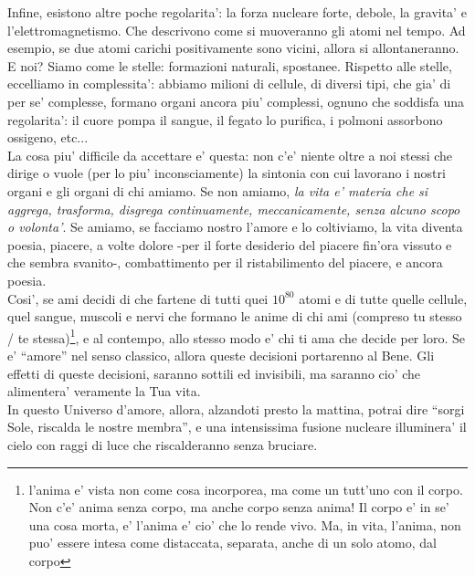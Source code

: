Infine, esistono altre poche regolarita': la forza nucleare forte, debole, la gravita' e l'elettromagnetismo. Che descrivono come si muoveranno gli atomi nel tempo. Ad esempio, se due atomi carichi positivamente sono vicini, allora si allontaneranno.\\

E noi? Siamo come le stelle: formazioni naturali, spostanee. Rispetto alle stelle, eccelliamo in complessita': abbiamo milioni di cellule, di diversi tipi, che gia' di per se' complesse, formano organi ancora piu' complessi, ognuno che soddisfa una regolarita': il cuore pompa il sangue, il fegato lo purifica, i polmoni assorbono ossigeno, etc...\\

La cosa piu' difficile da accettare e' questa: non c'e' niente oltre a noi stessi che dirige o vuole (per lo piu' inconsciamente) la sintonia con cui lavorano i nostri organi e gli organi di chi amiamo. Se non amiamo, \emph{la vita e' materia che si aggrega, trasforma, disgrega continuamente, meccanicamente, senza alcuno scopo o volonta'}. Se amiamo, se facciamo nostro l'amore e lo coltiviamo, la vita diventa poesia, piacere, a volte dolore -per il forte desiderio del piacere fin'ora vissuto e che sembra svanito-, combattimento per il ristabilimento del piacere, e ancora poesia. \\

Cosi', se ami decidi di che fartene di tutti quei $10^{80}$ atomi e di tutte quelle cellule, quel sangue, muscoli e nervi che formano le anime di chi ami (compreso tu stesso / te stessa)\footnote{l'anima e' vista non come cosa incorporea, ma come un tutt'uno con il corpo. Non c'e' anima senza corpo, ma anche corpo senza anima! Il corpo e' in se' una cosa morta, e' l'anima e' cio' che lo rende vivo. Ma, in vita, l'anima, non puo' essere intesa come distaccata, separata, anche di un solo atomo, dal corpo}, e al contempo, allo stesso modo e' chi ti ama che decide per loro. Se e' ``amore'' nel senso classico, allora queste decisioni portarenno al Bene. Gli effetti di queste decisioni, saranno sottili ed invisibili, ma saranno cio' che alimentera' veramente la Tua vita.\\

In questo Universo d'amore, allora, alzandoti presto la mattina, potrai dire ``sorgi Sole, riscalda le nostre membra'', e una intensissima fusione nucleare illuminera' il cielo con raggi di luce che riscalderanno senza bruciare.\\

